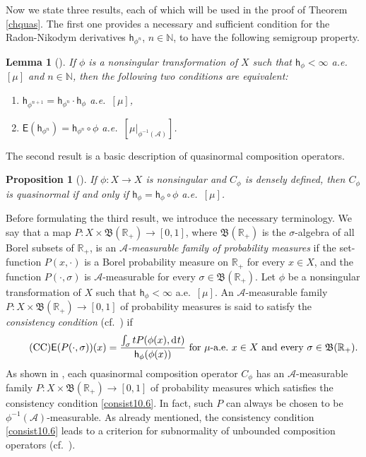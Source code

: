 \documentclass[draft,reqno]{amsproc}
\numberwithin{equation}{section}
\newtheorem{lem}[thm]{Lemma}
\newtheorem{pro}[thm]{Proposition}
\theoremstyle{remark}
\theoremstyle{definition}
\begin{document}
Now we state three results, each of which will be used
in the proof of Theorem \ref{chquas}. The first one
provides a necessary and sufficient condition for the
Radon-Nikodym derivatives ${\mathsf h}_{\phi^n}$, $n\in
{\mathbb N}$, to have the following semigroup property.
      \begin{lem}[\mbox{\cite[Lemma 9.1]{b-j-j-sC}}] \label{hf2}
If $\phi$ is a nonsingular transformation of $X$ such
that ${\mathsf h}_{\phi} < \infty$ a.e.\ $[\mu]$ and $n\in
{\mathbb N}$, then the following two conditions are
equivalent{\em :}
   \begin{enumerate}
   \item[(i)] ${\mathsf h}_{\phi^{n+1}} = {\mathsf h}_{\phi^n} \cdot {\mathsf h}_\phi$ a.e.\
$[\mu]$,
   \item[(ii)] ${\mathsf{E}}({\mathsf h}_{\phi^n}) = {\mathsf h}_{\phi^n}
\circ \phi$ a.e.\ $[\mu|_{\phi^{-1}({\mathscr A})}]$.
   \end{enumerate}
   \end{lem}
The second result is a basic description of
quasinormal composition operators.
   \begin{pro}[\mbox{\cite[Proposition 8.1]{b-j-j-sC}}]
\label{quasi} If $\phi\colon X \to X$ is nonsingular
and $C_{\phi}$ is densely defined, then $C_{\phi}$ is
quasinormal if and only if ${\mathsf h}_\phi = {\mathsf h}_\phi
\circ \phi$ a.e.\ $[\mu]$.
   \end{pro}
Before formulating the third result, we introduce the
necessary terminology. We say that a map $P\colon X
\times {{\mathfrak B}({{\mathbb R}_+})} \to [0,1]$, where
${{\mathfrak B}({{\mathbb R}_+})}$ is the $\sigma$-algebra of all Borel
subsets of ${\mathbb R}_+$, is an {\em ${\mathscr A}$-measurable
family of probability measures} if the set-function
$P(x,\cdot)$ is a Borel probability measure on
${\mathbb R}_+$ for every $x \in X$, and the function
$P(\cdot,\sigma)$ is ${\mathscr A}$-measurable for every
$\sigma \in {{\mathfrak B}({{\mathbb R}_+})}$. Let $\phi$ be a
nonsingular transformation of $X$ such that
${\mathsf h}_{\phi} < \infty$ a.e.\ $[\mu]$. An
${\mathscr A}$-measurable family $P\colon X \times
{{\mathfrak B}({{\mathbb R}_+})} \to [0,1]$ of probability measures is
said to satisfy the {\em consistency condition} (cf.\
\cite{b-j-j-sD}) if
   \begin{align}  \tag{CC} \label{consist10.6}
{\mathsf{E}}(P(\cdot, \sigma)) (x) = \frac{\int_{\sigma} t
P(\phi(x),\operatorname{d\hspace{-0.25ex}} t)}{{\mathsf h}_\phi(\phi(x))} \text{ for
$\mu$-a.e.\ $x \in X$ and every $\sigma \in
{{\mathfrak B}({{\mathbb R}_+})}$.}
   \end{align}
As shown in \cite[Proposition 3.6]{b-j-j-sD}, each
quasinormal composition operator $C_{\phi}$ has an
${\mathscr A}$-measurable family $P\colon X \times
{{\mathfrak B}({{\mathbb R}_+})} \to [0,1]$ of probability measures
which satisfies the consistency condition
\eqref{consist10.6}. In fact, such $P$ can always be
chosen to be $\phi^{-1}({\mathscr A})$-measurable. As already
mentioned, the consistency condition
\eqref{consist10.6} leads to a criterion for
subnormality of unbounded composition operators (cf.\
\cite[Theorem 3.5]{b-j-j-sD}).
\end{document}
